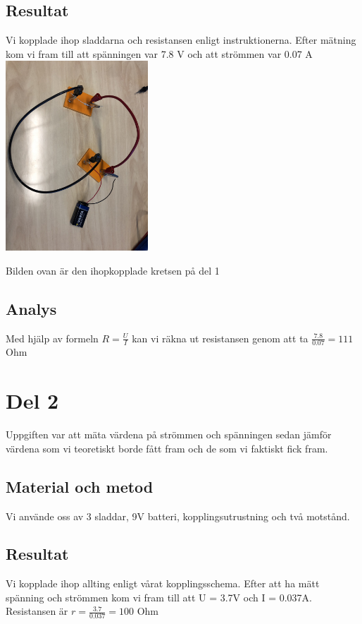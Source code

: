 \documentclass[11p]{article}
\begin{document}
    \subsection{Resultat}
    Vi kopplade ihop sladdarna och resistansen enligt instruktionerna.
    Efter mätning kom vi fram till att spänningen var 7.8 V och att strömmen var 0.07 A
    \includegraphics[width=0.4\textwidth]{../images/LabbDel1.jpg}

    Bilden ovan är den ihopkopplade kretsen på del 1
    \subsection{Analys}
    Med hjälp av formeln $ R=\frac{U}{I}$ kan vi räkna ut resistansen genom att ta $\frac{7.8}{0.07}=111$ Ohm
    \section{Del 2}
    Uppgiften var att mäta värdena på strömmen och spänningen sedan jämför värdena som vi teoretiskt borde fått fram och de som vi faktiskt fick fram.
    \subsection{Material och metod}
    Vi använde oss av 3 sladdar, 9V batteri, kopplingsutrustning och två motstånd.
    \subsection{Resultat}
    Vi kopplade ihop allting enligt vårat kopplingsschema.
    Efter att ha mätt spänning och strömmen kom vi fram till att U = 3.7V och I = 0.037A. Resistansen är $r=\frac{3.7}{0.037}=100$ Ohm
\end{document}
